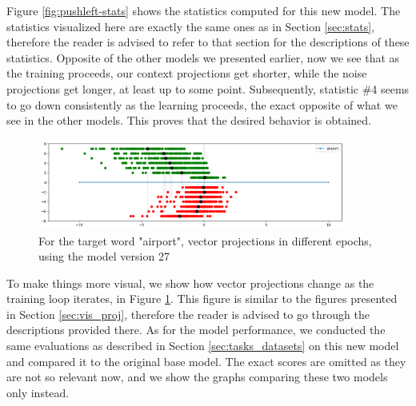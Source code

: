 Figure \ref{fig:pushleft-stats} shows the statistics computed for this new model. The statistics visualized here are exactly the same ones as in Section \ref{sec:stats}, therefore the reader is advised to refer to that section for the descriptions of these statistics. Opposite of the other models we presented earlier, now we see that as the training proceeds, our context projections get shorter, while the noise projections get longer, at least up to some point. Subsequently, statistic \#4 seems to go down consistently as the learning proceeds, the exact opposite of what we see in the other models. This proves that the desired behavior is obtained. 

\begin{figure}[h]
    \centering
    \includegraphics[width=0.9\textwidth]{img/airport_left.png}
    \caption{For the target word "airport", vector projections in different epochs, using the model version 27}
    \label{fig:airport_left}
\end{figure}

To make things more visual, we show how vector projections change as the training loop iterates, in Figure \ref{fig:airport_left}. This figure is similar to the figures presented in Section \ref{sec:vis_proj}, therefore the reader is advised to go through the descriptions provided there. As for the model performance, we conducted the same evaluations as described in Section \ref{sec:tasks_datasets} on this new model and compared it to the original base model. The exact scores are omitted as they are not so relevant now, and we show the graphs comparing these two models only instead.

